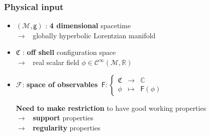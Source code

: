 \documentclass[9pt]{beamer}
\newcommand{\Ccal}{\mathcal{C}}
\newcommand{\Fcal}{\mathcal{F}}
\newcommand{\Mcal}{\mathcal{M}}
\newcommand{\Cbb}{\mathbb{C}}
\newcommand{\Rbb}{\mathbb{R}}
\newcommand{\Crak}{\mathfrak{C}}
\newcommand{\Fsf}{\mathsf{F}}
\newcommand{\gsf}{\mathsf{g}}
\begin{document}
\begin{frame}

\frametitle{Physical input}
  
\begin{itemize}
  
\item $(\Mcal,\gsf)$ : \textbf{4 dimensional} spacetime \\[2pt]
\qquad $\to$ \ globally hyperbolic Lorentzian manifold
    
\item $\Crak$ : \textbf{off shell} configuration space \\[2pt] 
\qquad $\to$ \ real scalar field $\phi \in \Ccal^\infty(\Mcal,\Rbb)$
        
\item $\Fcal$: \textbf{space of observables}
$
\ \Fsf : \left\{
\begin{array}{ccc}
\Crak & \to & \Cbb \\
\phi & \mapsto & \Fsf(\phi)
\end{array}
\right.
$
   
\vspace*{16pt}
   
\textbf{Need to make restriction} to have good working properties \\[5pt]

\qquad $\to$ \ \textbf{support} properties \\[3pt]
 
\qquad $\to$ \ \textbf{regularity} properties

\end{itemize}

\end{frame}  

\end{document}
